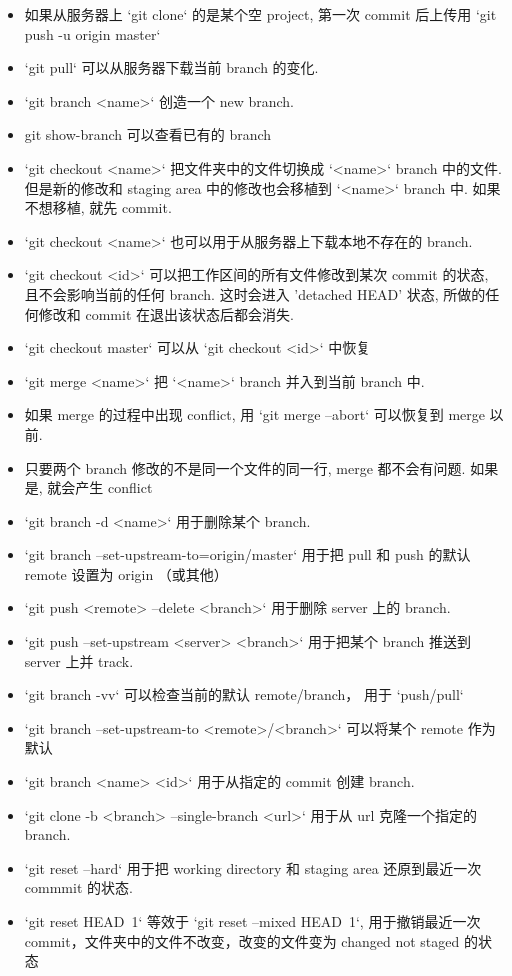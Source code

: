 \begin{itemize}
\item 如果从服务器上 `git clone` 的是某个空 project, 第一次 commit 后上传用 `git push -u origin master`
\item `git pull` 可以从服务器下载当前 branch 的变化.
\item `git branch <name>` 创造一个 new branch.
\item git show-branch 可以查看已有的 branch
\item `git checkout <name>` 把文件夹中的文件切换成 `<name>` branch 中的文件. 但是新的修改和 staging area 中的修改也会移植到 `<name>` branch 中. 如果不想移植, 就先 commit.
\item `git checkout <name>` 也可以用于从服务器上下载本地不存在的 branch.
\item `git checkout <id>` 可以把工作区间的所有文件修改到某次 commit 的状态, 且不会影响当前的任何 branch. 这时会进入 'detached HEAD' 状态, 所做的任何修改和 commit 在退出该状态后都会消失.
\item `git checkout master` 可以从 `git checkout <id>` 中恢复
\item `git merge <name>` 把 `<name>` branch 并入到当前 branch 中.
\item 如果 merge 的过程中出现 conflict, 用 `git merge --abort` 可以恢复到 merge 以前.
\item 只要两个 branch 修改的不是同一个文件的同一行, merge 都不会有问题. 如果是, 就会产生 conflict
\item `git branch -d <name>` 用于删除某个 branch.
\item `git branch --set-upstream-to=origin/master` 用于把 pull 和 push 的默认 remote 设置为 origin （或其他）
\item `git push <remote> --delete <branch>` 用于删除 server 上的 branch.
\item `git push --set-upstream <server> <branch>` 用于把某个 branch 推送到 server 上并 track.
\item `git branch -vv` 可以检查当前的默认 remote/branch， 用于 `push/pull`
\item `git branch --set-upstream-to <remote>/<branch>` 可以将某个 remote 作为默认
\item `git branch <name> <id>` 用于从指定的 commit 创建 branch.
\item `git clone -b <branch> --single-branch <url>` 用于从 url 克隆一个指定的 branch.
\item `git reset --hard` 用于把 working directory 和 staging area 还原到最近一次 commmit 的状态.
\item `git reset HEAD~1` 等效于 `git reset --mixed HEAD~1`, 用于撤销最近一次 commit，文件夹中的文件不改变，改变的文件变为 changed not staged 的状态

\end{itemize}
